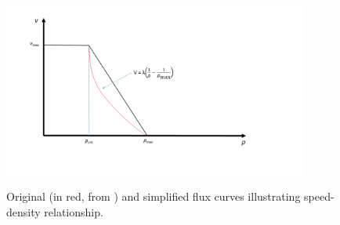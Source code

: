 \begin{figure}[h]
\centering
\includegraphics[width=0.9\textwidth]{img/micro-schematic.png}\\
\caption{Original (in red, from \cite{Dym2004PrinciplesModeling}) and simplified flux curves illustrating speed-density relationship.}
\label{fig:micro-schematic}
\end{figure}